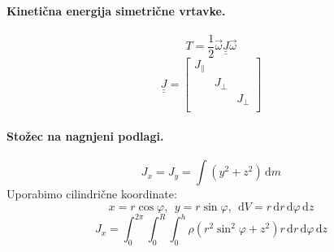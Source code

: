 \documentclass[a4paper]{article}
\newcommand{\vct}[1]{\overrightarrow{#1}}
\newcommand{\dif}{\mathrm{d}}
\newcommand{\duline}[1]{\underline{\underline{#1}}}
\begin{document}
\paragraph{Kinetična energija simetrične vrtavke.} $$T = \frac{1}{2}\vct{\omega}\duline{J}\vct{\omega}$$
$$\duline{J} = \begin{bmatrix}
    J_\parallel && \\
    & J_\perp & \\
    && J_\perp \\
\end{bmatrix}$$
\paragraph{Stožec na nagnjeni podlagi.} $$J_x = J_y = \int (y^2 + z^2)\,\dif m$$
Uporabimo cilindrične koordinate:
$$x = r\cos\varphi,~~y = r\sin\varphi,~~\dif V = r\,\dif r\,\dif\varphi\,\dif z$$
$$J_x = \int_{0}^{2\pi}\int_{0}^{R}\int_{0}^{h} \rho \left(r^2\sin^2\varphi + z^2\right)r\,\dif r\,\dif\varphi\,\dif z$$
\end{document}
